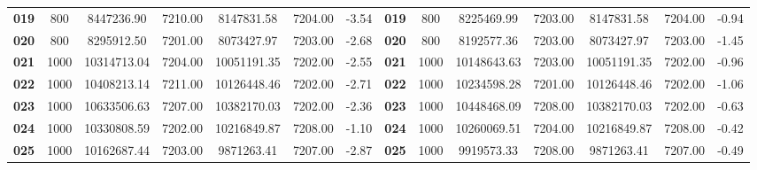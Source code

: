 \begin{table}[ht]
{\begin{tabular}{cccccccccccccc}
    \textbf{019}         & 800                         & 8447236.90          & 7210.00          & 8147831.58           & 7204.00       & -3.54                          & \textbf{019}         & 800                         & 8225469.99           & 7203.00           & 8147831.58           & 7204.00        & -0.94                           \\
    \textbf{020}         & 800                         & 8295912.50          & 7201.00          & 8073427.97           & 7203.00       & -2.68                          & \textbf{020}         & 800                         & 8192577.36           & 7203.00           & 8073427.97           & 7203.00        & -1.45                           \\
    \textbf{021}         & 1000                         & 10314713.04          & 7204.00          & 10051191.35           & 7202.00       & -2.55                          & \textbf{021}         & 1000                         & 10148643.63           & 7203.00           & 10051191.35           & 7202.00        & -0.96                           \\
    \textbf{022}         & 1000                         & 10408213.14          & 7211.00          & 10126448.46           & 7202.00       & -2.71                          & \textbf{022}         & 1000                         & 10234598.28           & 7201.00           & 10126448.46           & 7202.00        & -1.06                           \\
    \textbf{023}         & 1000                         & 10633506.63          & 7207.00          & 10382170.03           & 7202.00       & -2.36                          & \textbf{023}         & 1000                         & 10448468.09           & 7208.00           & 10382170.03           & 7202.00        & -0.63                           \\
    \textbf{024}         & 1000                         & 10330808.59          & 7202.00          & 10216849.87           & 7208.00       & -1.10                          & \textbf{024}         & 1000                         & 10260069.51           & 7204.00           & 10216849.87           & 7208.00        & -0.42                           \\
    \textbf{025}         & 1000                         & 10162687.44          & 7203.00          & 9871263.41           & 7207.00       & -2.87                          & \textbf{025}         & 1000                         & 9919573.33           & 7208.00           & 9871263.41           & 7207.00        & -0.49                           \\ 
    \bottomrule
    \end{tabular}
    }
    \end{table} 